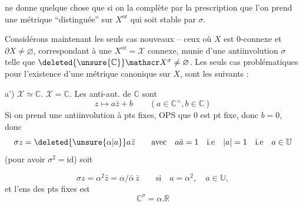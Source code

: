 
ne donne quelque chose que si on la complète par la prescription que l'on prend une métrique ``distinguée'' sur $X^{\mathrm{or}}$ qui soit stable par $\sigma$.

Considérons maintenant les seuls cas nouveaux -- ceux où $X$ est 0-connexe et $\partial X\ne\varnothing$, correspondant à une $X^{\mathrm{or}}=\mathscr X$ connexe, munie d'une antiinvolution $\sigma$ telle que $\deleted{\unsure{\mathbb C}}\mathscr X^\sigma\ne\varnothing$. Les seuls cas problématiques pour l'existence d'une métrique canonique sur $X$, sont les suivants :

a') $\mathscr X\simeq\mathbb C$.  $\mathscr X=\mathbb C$. Les anti-aut. de $\mathbb C$ sont
\[
z\longmapsto a\bar z+b\qquad(a\in\mathbb C^{\times},b\in\mathbb C)
\]
Si on prend une antiinvolution à pts fixes, OPS que $0$ est pt fixe, donc $b=0$, donc 
\[
\sigma z=\deleted{\unsure{\alpha|a}}a\bar z\qquad\text{avec}\quad a\bar a=1\quad\text{i.e}\quad |a|=1\quad\text{i.e}\quad a\in\mathbb U
\]
(pour avoir $\sigma^2=\mathrm{id}$) soit

\[
\sigma z=\alpha^2\bar z=\alpha/\bar\alpha\,\bar z\qquad\text{si}\quad a=\alpha^2,\quad a\in\mathbb U,
\]
et l'ens des pts fixes est
\[
\mathbb C^\sigma=\alpha.\mathbb R
\]
